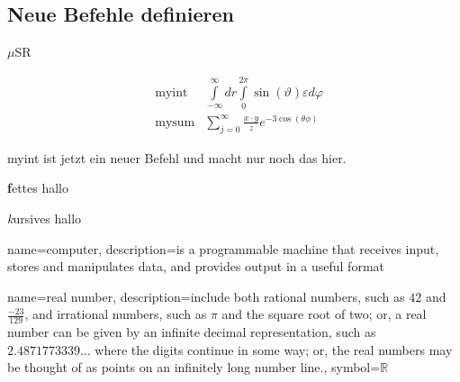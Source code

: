 \documentclass[12pt, a4paper, twopage]{scrartcl}
\begin{document}
\begin{appendix}
\section{Neue Befehle definieren}
\newcommand{\musr}{$\mu$SR }
\musr


\newcommand{\myint}{\int\limits_{-\infty}^{\infty} dr \int\limits_{0}^{2 \pi} \sin(\vartheta) \varepsilon d\varphi}

\newcommand{\mysum}[3]{\sum\limits_{j = 0}^{\infty} \frac{#1\cdot #2}{#3} e^{- 3 \cos(\theta \phi)}}

\begin{align*}
  &\text{myint} & \myint\\
  &\text{mysum} & \mysum{x}{y}{z}
\end{align*}

\renewcommand{\myint}{myint ist jetzt ein neuer Befehl und macht nur noch das hier.}

\myint

\vspace{2cm}
\newcommand{\fett}[1]{{\textbf #1}}

\fett{fettes hallo}

\newcommand{\kursiv}[1]{{\textit #1}}

\kursiv{kursives hallo}



\end{appendix}







\printbibliography











{
	name=computer,
	description={is a programmable machine that receives input,
		stores and manipulates data, and provides
		output in a useful format}
}


{
	name={real number},
	description={include both rational numbers, such as $42$ and 
		$\frac{-23}{129}$, and irrational numbers, 
		such as $\pi$ and the square root of two; or,
		a real number can be given by an infinite decimal
		representation, such as $2.4871773339\ldots$ where
		the digits continue in some way; or, the real
		numbers may be thought of as points on an infinitely
		long number line.},
	symbol={\ensuremath{\mathbb{R}}}
}


\printglossary[title=My Glossary, toctitle=Glossary Title in ToC ]
\end{document}
